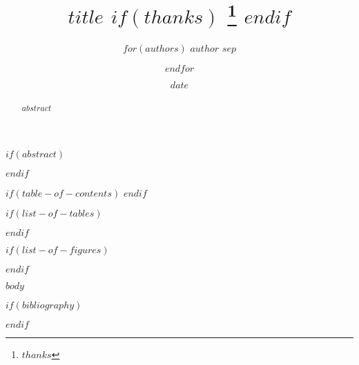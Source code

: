 \documentclass[
  $if(paper-size)$
    $paper-size$paper,
  $endif$
  $if(font-size)$
    $font-size$,
  $endif$
  $if(two-column)$
    twocolumn,
  $endif$
  $if(titlepage)$
    titlepage,
  $endif$
  $if(draft)$
    draft,
  $endif$
]{$document-type$}
\title{
  $title$
  $if(thanks)$
    \thanks{$thanks$}
  $endif$
}
\author{
  $for(authors)$
    $author$
    $sep$ \and 
  $endfor$
}
\date{$date$}
\begin{document}
\maketitle

$if(abstract)$
  \begin{abstract}
    $abstract$
  \end{abstract}
$endif$

$if(table-of-contents)$
  \setcounter{tocdepth}{$table-of-contents.depth$}
  \tableofcontents
$endif$

$if(list-of-tables)$
  \listoftables
$endif$

$if(list-of-figures)$
  \listoffigures
$endif$

$body$

$if(bibliography)$
  \newpage
  
$endif$
\end{document}
